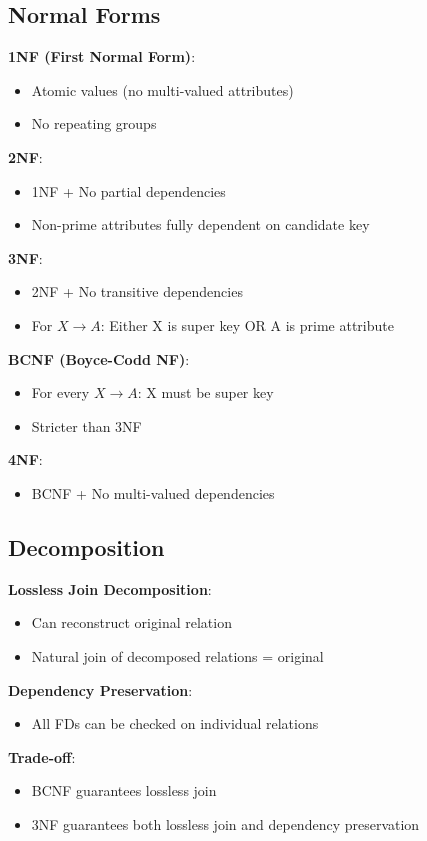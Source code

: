\documentclass[12pt,a4paper]{report}
\begin{document}
\subsection{Normal Forms}
\begin{concept}
\textbf{1NF (First Normal Form)}:
\begin{itemize}
    \item Atomic values (no multi-valued attributes)
    \item No repeating groups
\end{itemize}

\textbf{2NF}:
\begin{itemize}
    \item 1NF + No partial dependencies
    \item Non-prime attributes fully dependent on candidate key
\end{itemize}

\textbf{3NF}:
\begin{itemize}
    \item 2NF + No transitive dependencies
    \item For $X \to A$: Either X is super key OR A is prime attribute
\end{itemize}

\textbf{BCNF (Boyce-Codd NF)}:
\begin{itemize}
    \item For every $X \to A$: X must be super key
    \item Stricter than 3NF
\end{itemize}

\textbf{4NF}:
\begin{itemize}
    \item BCNF + No multi-valued dependencies
\end{itemize}
\end{concept}

\subsection{Decomposition}
\begin{concept}
\textbf{Lossless Join Decomposition}:
\begin{itemize}
    \item Can reconstruct original relation
    \item Natural join of decomposed relations = original
\end{itemize}

\textbf{Dependency Preservation}:
\begin{itemize}
    \item All FDs can be checked on individual relations
\end{itemize}

\textbf{Trade-off}:
\begin{itemize}
    \item BCNF guarantees lossless join
    \item 3NF guarantees both lossless join and dependency preservation
\end{itemize}
\end{concept}
\end{document}
